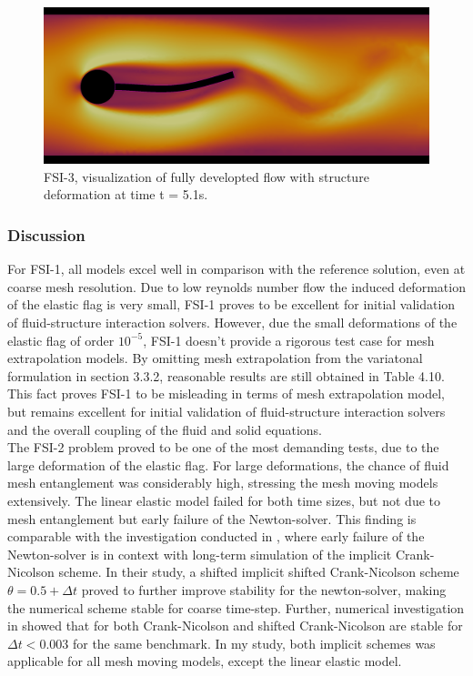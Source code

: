 \begin{figure}[h!]
  \centering
    \includegraphics[scale=0.2]{./Fig/fsi3flow.png}
      \caption{FSI-3, visualization of fully developted flow with structure deformation at time t = 5.1s.}
\end{figure}

\newpage
\subsubsection*{Discussion}
For FSI-1, all models excel well in comparison with the reference solution, even at coarse mesh resolution. Due to low reynolds number flow the induced deformation of the elastic flag is very small, FSI-1 proves to be excellent for initial validation of fluid-structure interaction solvers. However, due the small deformations of the elastic flag of order $10^{-5}$,  FSI-1 doesn't provide a rigorous test case for mesh extrapolation models.  By omitting mesh extrapolation from the variatonal formulation in section 3.3.2,  reasonable results are still obtained in Table 4.10. This fact proves FSI-1 to be misleading in terms of mesh extrapolation model, but remains excellent for initial validation of fluid-structure interaction solvers and the overall coupling of the fluid and solid equations. \\

The FSI-2 problem proved to be one of the most demanding tests, due to the large deformation of the elastic flag. For large deformations, the chance of fluid mesh entanglement was considerably high, stressing the mesh moving models extensively. The linear elastic model failed for both time sizes, but not due to mesh entanglement but early failure of the Newton-solver. This finding is comparable with the investigation conducted in \cite{Richter2015}, where early failure of the Newton-solver is in context with long-term simulation of the implicit Crank-Nicolson scheme. In their study, a shifted implicit shifted Crank-Nicolson scheme $\theta = 0.5 + \Delta t$ proved to further improve stability for the newton-solver, making the numerical scheme stable for coarse time-step. Further, numerical investigation in \cite{Richter2015} showed that for both Crank-Nicolson and  shifted Crank-Nicolson are stable for $\Delta t < 0.003$ for the same benchmark. In my study, both implicit schemes was applicable for all mesh moving models, except the linear elastic model. \\

